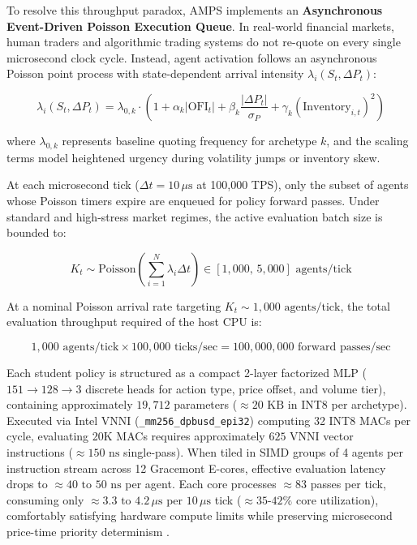 To resolve this throughput paradox, AMPS implements an \textbf{Asynchronous Event-Driven Poisson Execution Queue}. In real-world financial markets, human traders and algorithmic trading systems do not re-quote on every single microsecond clock cycle. Instead, agent activation follows an asynchronous Poisson point process with state-dependent arrival intensity $\lambda_i(S_t, \Delta P_t)$:

\begin{equation}
    \lambda_i(S_t, \Delta P_t) = \lambda_{0, k} \cdot \left( 1 + \alpha_k |\text{OFI}_t| + \beta_k \frac{|\Delta P_t|}{\sigma_P} + \gamma_k (\text{Inventory}_{i, t})^2 \right)
\end{equation}

where $\lambda_{0, k}$ represents baseline quoting frequency for archetype $k$, and the scaling terms model heightened urgency during volatility jumps or inventory skew. 

At each microsecond tick ($\Delta t = 10\,\mu\text{s}$ at 100,000 TPS), only the subset of agents whose Poisson timers expire are enqueued for policy forward passes. Under standard and high-stress market regimes, the active evaluation batch size is bounded to:

\begin{equation}
    K_t \sim \text{Poisson}\left( \sum_{i=1}^N \lambda_i \Delta t \right) \in [1,000, \, 5,000]\text{ agents/tick}
\end{equation}

At a nominal Poisson arrival rate targeting $K_t \sim 1,000\text{ agents/tick}$, the total evaluation throughput required of the host CPU is:

\begin{equation}
    1,000\text{ agents/tick} \times 100,000\text{ ticks/sec} = 100,000,000\text{ forward passes/sec}
\end{equation}

Each student policy is structured as a compact 2-layer factorized MLP ($151 \to 128 \to 3$ discrete heads for action type, price offset, and volume tier), containing approximately $19,712$ parameters ($\approx 20\text{ KB}$ in INT8 per archetype). Executed via Intel VNNI (\texttt{\_mm256\_dpbusd\_epi32}) computing 32 INT8 MACs per cycle, evaluating 20K MACs requires approximately $625$ VNNI vector instructions ($\approx 150\text{ ns}$ single-pass). When tiled in SIMD groups of 4 agents per instruction stream across 12 Gracemont E-cores, effective evaluation latency drops to $\approx 40\text{ to }50\text{ ns}$ per agent. Each core processes $\approx 83$ passes per tick, consuming only $\approx 3.3\text{ to }4.2\,\mu\text{s}$ per $10\,\mu\text{s}$ tick ($\approx 35\text{-}42\%$ core utilization), comfortably satisfying hardware compute limits while preserving microsecond price-time priority determinism \cite{ohara1995market, cartea2015algorithmic}.

